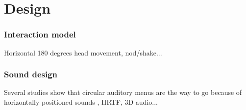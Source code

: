 \chapter{Design}

\subsection{Interaction model}
Horizontal 180 degrees head movement, nod/shake...

\subsection{Sound design}
Several studies show that circular auditory menus are the way to go because of horizontally positioned sounds , HRTF, 3D audio...
